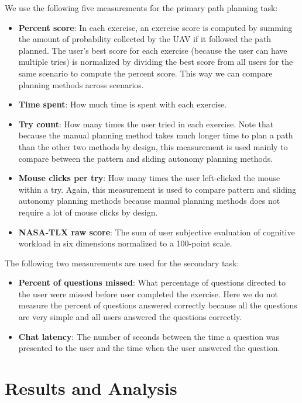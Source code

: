\documentclass[journal]{IEEEtran}
\begin{document}
We use the following five measurements for the primary path planning task:

\begin{itemize}
\item \textbf{Percent score}: In each exercise, an exercise score is computed by summing the amount of probability collected by the UAV if it followed the path planned. The user's best score for each exercise (because the user can have multiple tries) is normalized by dividing the best score from all users for the same scenario to compute the percent score. This way we can compare planning methods across scenarios.
\item \textbf{Time spent}: How much time is spent with each exercise.
\item \textbf{Try count}: How many times the user tried in each exercise. Note that because the manual planning method takes much longer time to plan a path than the other two methods by design, this measurement is used mainly to compare between the pattern and sliding autonomy planning methods.
\item \textbf{Mouse clicks per try}: How many times the user left-clicked the mouse within a try. Again, this measurement is used to compare pattern and sliding autonomy planning methods because manual planning methods does not require a lot of mouse clicks by design.
\item \textbf{NASA-TLX raw score}: The sum of user subjective evaluation of cognitive workload in six dimensions normalized to a 100-point scale. 
\end{itemize}

The following two measurements are used for the secondary task:
\begin{itemize}
\item \textbf{Percent of questions missed}: What percentage of questions directed to the user were missed before user completed the exercise. Here we do not measure the percent of questions answered correctly because all the questions are very simple and all users answered the questions correctly.
\item \textbf{Chat latency}: The number of seconds between the time a question was presented to the user and the time when the user answered the question.
\end{itemize}

\section{Results and Analysis} 
\label{sec:Results}
\end{document}
